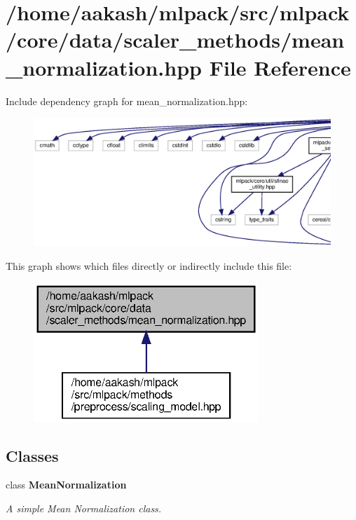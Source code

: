 \section{/home/aakash/mlpack/src/mlpack/core/data/scaler\+\_\+methods/mean\+\_\+normalization.hpp File Reference}
\label{mean__normalization_8hpp}
Include dependency graph for mean\+\_\+normalization.\+hpp\+:
\nopagebreak
\begin{figure}[H]
\begin{center}
\leavevmode
\includegraphics[width=350pt]{mean__normalization_8hpp__incl}
\end{center}
\end{figure}
This graph shows which files directly or indirectly include this file\+:
\nopagebreak
\begin{figure}[H]
\begin{center}
\leavevmode
\includegraphics[width=241pt]{mean__normalization_8hpp__dep__incl}
\end{center}
\end{figure}
\subsection*{Classes}
\begin{DoxyCompactItemize}
\item 
class \textbf{ Mean\+Normalization}
\begin{DoxyCompactList}\small\item\em A simple Mean Normalization class. \end{DoxyCompactList}\end{DoxyCompactItemize}
